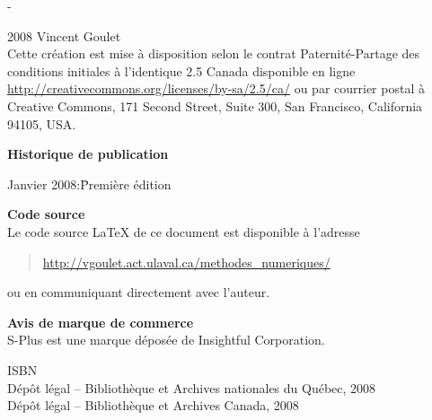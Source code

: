 \begingroup
\calccentering{\unitlength}
\begin{adjustwidth*}{\unitlength}{-\unitlength}
  \small
  \setlength{\parindent}{0pt}
  \setlength{\parskip}{\baselineskip}

  {\textcopyright} 2008 Vincent Goulet \\

  Cette création est mise à disposition selon le contrat
  Paternité-Partage des conditions initiales à l'identique 2.5 Canada
  disponible en ligne
  \url{http://creativecommons.org/licenses/by-sa/2.5/ca/} ou par
  courrier postal à Creative Commons, 171 Second Street, Suite 300,
  San Francisco, California 94105, USA.

  \textbf{Historique de publication}
  \begin{tabbing}
    Janvier 2008:\quad\= Première édition
  \end{tabbing}

  \textbf{Code source} \\
  Le code source {\LaTeX} de ce document est disponible à l'adresse
  \begin{quote}
    \url{http://vgoulet.act.ulaval.ca/methodes_numeriques/}
  \end{quote}
  ou en communiquant directement avec l'auteur.

  \textbf{Avis de marque de commerce} \\
  S-Plus{\textregistered} est une marque déposée de Insightful
  Corporation.

  \vspace{1cm}

  ISBN \ISBN \\
  Dépôt légal -- Bibliothèque et Archives nationales du Québec, 2008 \\
  Dépôt légal -- Bibliothèque et Archives Canada, 2008
\end{adjustwidth*}
\endgroup

\renewcommand{\sfdefault}{phv}


